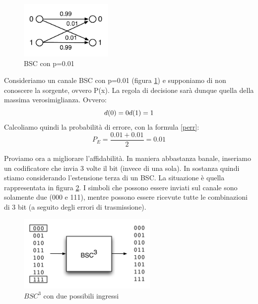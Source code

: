 \begin{figure}[htbp]
\begin{center}
	\includegraphics[width=0.4\textwidth]{img/bsc99.pdf}
\caption{BSC con p=0.01}
\label{fig:bsc99}
\end{center}
\end{figure}


Consideriamo un canale BSC con p=0.01 (figura \ref{fig:bsc99}) e supponiamo di non conoscere la sorgente, ovvero P(x). La regola di decisione 
sarà dunque quella della massima verosimiglianza. Ovvero:
\[
 d(0)=0 \\ d(1)=1
\]
Calcoliamo quindi la probabilità di errore, con la formula \eqref{perr}:
\[
 P_E=\frac{0.01+0.01}{2}=0.01
\]

Proviamo ora a migliorare l'affidabilità. In maniera abbastanza banale, inseriamo un codificatore che invia 3 volte il bit (invece di una sola). In sostanza quindi stiamo considerando l'estensione terza di un BSC. La situazione è quella rappresentata in figura \ref{fig:bsc3}. I simboli che possono essere inviati sul canale sono solamente due (000 e 111), mentre possono essere ricevute tutte le 
combinazioni di 3 bit (a seguito degli errori di trasmissione).

\begin{figure}[htbp]
\begin{center}
	\includegraphics[width=0.6\textwidth]{img/bsc3.pdf}
\caption{$BSC^3$ con due possibili ingressi}
\label{fig:bsc3}
\end{center}
\end{figure}

